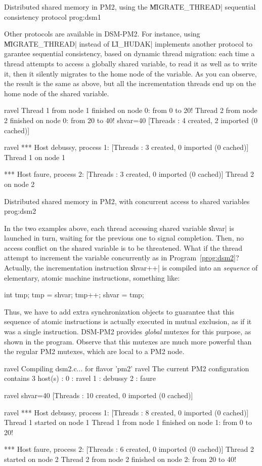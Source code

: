  {Distributed shared memory in PM2, using
  the \|MIGRATE_THREAD| sequential consistency protocol}
{prog:dsm1}

Other protocols are available in DSM-PM2. For instance, using
\|MIGRATE_THREAD| instead of \|LI_HUDAK| implements another protocol
to garantee sequential consistency, based on dynamic thread migration:
each time a thread attempts to access a globally shared variable, to
read it as well as to write it, then it silently migrates to the home
node of the variable. As you can observe, the result is the same as
above, but all the incrementation threads end up on the home node of
the shared variable.
\begin{shell}
ravel%
Thread 1 from node 1 finished on node 0: from 0 to 20!
Thread 2 from node 2 finished on node 0: from 20 to 40!
shvar=40
[Threads : 4 created, 2 imported (0 cached)]

ravel%
*** Host debussy, process 1:
[Threads : 3 created, 0 imported (0 cached)]
Thread 1 on node 1

*** Host faure, process 2:
[Threads : 3 created, 0 imported (0 cached)]
Thread 2 on node 2
\end{shell}


 {Distributed shared memory in PM2, with
  concurrent access to shared variables} {prog:dsm2}

In the two examples above, each thread accessing shared variable
\|shvar| is launched in turn, waiting for the previous one to signal
completion. Then, no access conflict on the shared variable is to be
threatened. What if the thread attempt to increment the variable
concurrently as in Program~\ref{prog:dsm2}? Actually, the
incrementation instruction \|shvar++| is compiled into an
\emph{sequence} of elementary, atomic machine instructions, something
like:
\begin{program}
{int tmp; tmp = shvar; tmp++; shvar = tmp;}
\end{program}
Thus, we have to add extra synchronization objects to guarantee that
this sequence of atomic instructions is actually executed in mutual
exclusion, as if it was a single instruction. DSM-PM2 provides
\emph{global} mutexes for this purpose, as shown in the program.
Observe that this mutexes are much more powerful than the regular PM2
mutexes, which are local to a PM2 node.
\begin{shell}
ravel%
Compiling dsm2.c... for flavor 'pm2'
ravel%
The current PM2 configuration contains 3 host(s) :
0 : ravel
1 : debussy
2 : faure

ravel%
shvar=40
[Threads : 10 created, 0 imported (0 cached)]

ravel%
*** Host debussy, process 1:
[Threads : 8 created, 0 imported (0 cached)]
Thread 1 started on node 1
Thread 1 from node 1 finished on node 1: from 0 to 20!

*** Host faure, process 2:
[Threads : 6 created, 0 imported (0 cached)]
Thread 2 started on node 2
Thread 2 from node 2 finished on node 2: from 20 to 40!
\end{shell}

